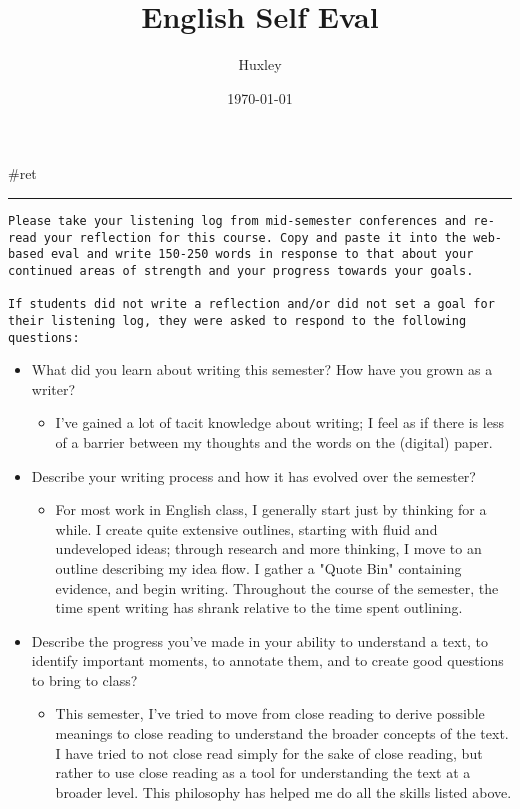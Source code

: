 \documentclass[letterpaper]{article}
\author{Huxley}
\date{\today}
\title{English Self Eval}
\renewcommand{\tableofcontents}{}
\begin{document}
\tableofcontents

\#ret

\noindent\rule{\textwidth}{0.5pt}

\begin{verbatim}
Please take your listening log from mid-semester conferences and re-read your reflection for this course. Copy and paste it into the web-based eval and write 150-250 words in response to that about your continued areas of strength and your progress towards your goals.

If students did not write a reflection and/or did not set a goal for their listening log, they were asked to respond to the following questions: 
\end{verbatim}

\begin{itemize}
\item What did you learn about writing this semester? How have you grown as
a writer?

\begin{itemize}
\item I've gained a lot of tacit knowledge about writing; I feel as if
there is less of a barrier between my thoughts and the words on the
(digital) paper.
\end{itemize}

\item Describe your writing process and how it has evolved over the
semester?

\begin{itemize}
\item For most work in English class, I generally start just by thinking
for a while. I create quite extensive outlines, starting with fluid
and undeveloped ideas; through research and more thinking, I move to
an outline describing my idea flow. I gather a "Quote Bin"
containing evidence, and begin writing. Throughout the course of the
semester, the time spent writing has shrank relative to the time
spent outlining.
\end{itemize}

\item Describe the progress you've made in your ability to understand a
text, to identify important moments, to annotate them, and to create
good questions to bring to class?

\begin{itemize}
\item This semester, I've tried to move from close reading to derive
possible meanings to close reading to understand the broader
concepts of the text. I have tried to not close read simply for the
sake of close reading, but rather to use close reading as a tool for
understanding the text at a broader level. This philosophy has
helped me do all the skills listed above.
\end{itemize}


\end{itemize}
\end{document}
